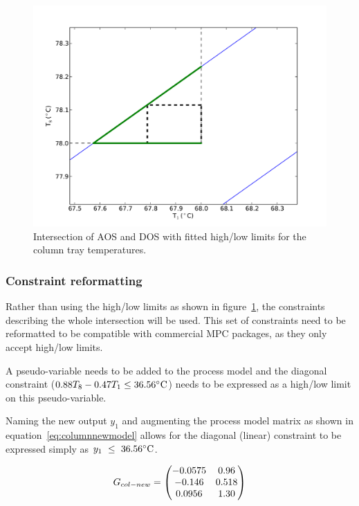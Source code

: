 \begin{figure}[htbp]
  \centering
    \includegraphics[width=\fullwidth]{graph/columnfitbox.pdf}
  \caption[Fitted constraints for the laboratory distillation column]{Intersection of AOS and DOS with fitted high/low limits for the column tray temperatures.}
  \label{fig:columnfitbox}
\end{figure}

\subsubsection{Constraint reformatting}
Rather than using the high/low limits as shown in figure~\ref{fig:columnfitbox}, the constraints describing the whole intersection will be used.
This set of constraints need to be reformatted to be compatible with commercial MPC packages, as they only accept high/low limits.

A pseudo-variable needs to be added to the process model and the diagonal constraint ($0.88T_8-0.47T_1\leq 36.56^{\circ}\text{{C}} $) needs to be expressed as a high/low limit on this pseudo-variable.

Naming the new output $y_1$ and augmenting the process model matrix as shown in equation~\ref{eq:columnnewmodel} allows for the diagonal (linear) constraint to be expressed simply as {$y_1~\leq~36.56^{\circ}\text{{C}}$}.

\begin{equation}
  \label{eq:columnnewmodel}
  G_{col-new}= \bpm -0.0575 & 0.96 \\       %
                  -0.146  & 0.518 \\      %
                   0.0956 & 1.30 \\ \epm  %
\end{equation}

